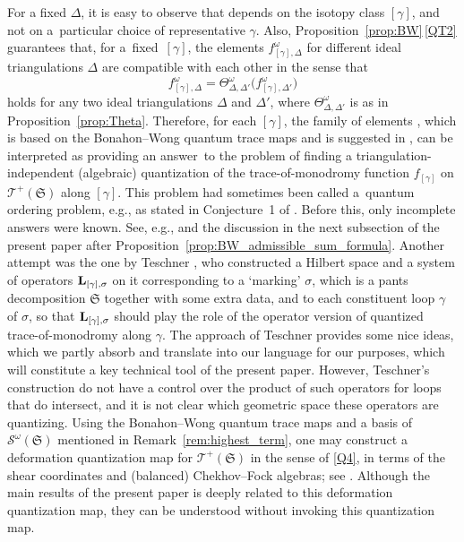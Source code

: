 \documentclass[pdftex]{sigma}
\numberwithin{equation}{section}
\theoremstyle{definition}
\begin{document}
For a fixed $\Delta$, it is easy to observe that  depends on the isotopy class $[\gamma]$, and not on a~particular choice of representative $\gamma$. Also, Proposition~\ref{prop:BW}\,\ref{QT2} guarantees that, for a~fixed~$[\gamma]$, the elements $f^\omega_{[\gamma],\Delta}$ for different ideal triangulations $\Delta$ are compatible with each other in the sense that
\[
f^\omega_{[\gamma],\Delta} = \Theta^\omega_{\Delta,\Delta'}\bigl(f^\omega_{[\gamma],\Delta'}\bigr)
\]
holds for any two ideal triangulations $\Delta$ and $\Delta'$, where $\Theta^\omega_{\Delta,\Delta'}$ is as in Proposition~\ref{prop:Theta}. Therefore, for each $[\gamma]$, the family of elements , which is based on the Bonahon--Wong quantum trace maps \cite{BW} and is suggested in \cite{AK}, can be interpreted as providing an answer~to the problem of finding a triangulation-independent (algebraic) quantization of the trace-of-monodromy function $f_{[\gamma]}$ on $\mathscr{T}^+(\mathfrak{S})$ along $[\gamma]$. This problem had sometimes been called a~quantum ordering problem, e.g., as stated in Conjecture~1 of \cite{CF2}.
Before this, only incomplete answers were known. See, e.g., \cite{F97, CF2} and the discussion in the next subsection of the present paper after Proposition~\ref{prop:BW_admissible_sum_formula}. Another attempt was the one by Teschner \cite{T}, who constructed a Hilbert space and a system of operators ${\bf L}_{[\gamma],\sigma}$ on it corresponding to a `marking' $\sigma$, which is a pants decomposition $\mathfrak{S}$ together with some extra data, and to each constituent loop $\gamma$ of $\sigma$, so that ${\bf L}_{[\gamma],\sigma}$ should play the role of the operator version of quantized trace-of-monodromy along $\gamma$. The approach of Teschner provides some nice ideas, which we partly absorb and translate into our language for our purposes, which will constitute a key technical tool of the present paper. However, Teschner's construction do not have a control over the product of such operators for loops that do intersect, and it is not clear which geometric space these operators are quantizing.
Using the Bonahon--Wong quantum trace maps and a basis of $\mathcal{S}^\omega(\mathfrak{S})$ mentioned in Remark~\ref{rem:highest_term}, one may construct a deformation quantization map for $\mathscr{T}^+(\mathfrak{S})$ in the sense of \ref{Q4}, in terms of the shear coordinates and (balanced) Chekhov--Fock algebras; see \cite{AK,CKKO,KS}. Although the main results of the present paper is deeply related to this deformation quantization map, they can be understood without invoking this quantization map.
\end{document}
